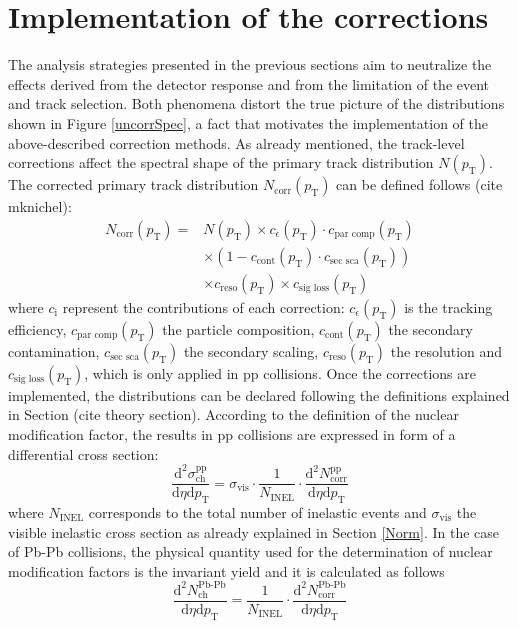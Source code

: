 \documentclass[12pt,a4paper]{report}
\begin{document}
\section{Implementation of the corrections}
The analysis strategies presented in the previous sections aim to neutralize the effects derived from the detector response and from the limitation of the event and track selection. Both phenomena distort the true picture of the \pt distributions shown in Figure \ref{uncorrSpec}, a fact that motivates the implementation of the above-described correction methods. As already mentioned, the track-level corrections affect the spectral shape of the primary track distribution $N(p_\text{T})$. The corrected primary track distribution $N_\text{corr}(p_\text{T})$ can be defined follows (cite mknichel):
\begin{equation}
\begin{split}
N_\text{corr}(p_\text{T}) = & N(p_\text{T}) \times c_\epsilon(p_\text{T}) \cdot c_\text{par comp}(p_\text{T})\\
& \times (1 - c_\text{cont}(p_\text{T}) \cdot c_\text{sec sca}(p_\text{T})) \\
&\times c_\text{reso}(p_\text{T}) \times c_\text{sig loss}(p_\text{T})
\end{split}
\end{equation}
where $c_\text{i}$ represent the contributions of each correction: $c_\epsilon(p_\text{T})$ is the tracking efficiency, $c_\text{par comp}(p_\text{T})$ the particle composition, $c_\text{cont}(p_\text{T})$ the secondary contamination, $c_\text{sec sca}(p_\text{T})$ the secondary scaling, $c_\text{reso}(p_\text{T})$ the \pt resolution and  $c_\text{sig loss}(p_\text{T})$, which is only applied in pp collisions. Once the corrections are implemented, the \pt distributions can be declared following the definitions explained in Section (cite theory section).
According to the definition of the nuclear modification factor, the results in pp collisions are expressed in form of a differential cross section: 
\begin{equation}
\dfrac{\text{d}^2 \sigma^\text{pp}_\text{ch} }{\text{d}\eta \text{d}p_\text{T}} = \sigma_\text{vis} \cdot \dfrac{1}{N_\text{INEL}} \cdot \dfrac{\text{d}^2 N^\text{pp}	_\text{corr}}{\text{d}\eta \text{d}p_\text{T}}
\end{equation}
where $N_\text{INEL}$ corresponds to the total number of inelastic events and $\sigma_\text{vis}$ the visible inelastic cross section as already explained in Section \ref{Norm}. 
In the case of Pb-Pb collisions, the physical quantity used for the determination of nuclear modification factors is the invariant yield and it is calculated as follows
\begin{equation}
\dfrac{\text{d}^2 N^\text{Pb-Pb}_\text{ch}}{\text{d}\eta \text{d}p_\text{T}} = \dfrac{1}{N_\text{INEL}} \cdot \dfrac{\text{d}^2 N^\text{Pb-Pb}_\text{corr}}{\text{d}\eta \text{d}p_\text{T}}
\end{equation}
\end{document}
